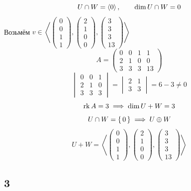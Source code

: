 $$ U \cap W = \braket{0}, \qquad \dim U \cap W = 0 $$
Возьмём $ v \in \left\langle
\begin{pmatrix}
	0 \\
    0 \\
    1 \\
    1
\end{pmatrix},
\begin{pmatrix}
	2 \\
    1 \\
    0 \\
    0
\end{pmatrix},
\begin{pmatrix}
	3 \\
    3 \\
    3 \\
    13
\end{pmatrix} \right\rangle $
$$ A =
\begin{pmatrix}
	0 & 0 & 1 & 1 \\
    2 & 1 & 0 & 0 \\
    3 & 3 & 3 & 13
\end{pmatrix} $$
$$
\begin{vmatrix}
	0 & 0 & 1 \\
    2 & 1 & 0 \\
    3 & 3 & 3
\end{vmatrix} =
\begin{vmatrix}
	2 & 1 \\
    3 & 3
\end{vmatrix} = 6 - 3 \ne 0 $$
$$ \operatorname{rk} A = 3 \implies \dim U + W = 3 $$
$$ U \cap W = \set{0} \implies U \oplus W $$
$$ U + W = \left\langle
\begin{pmatrix}
	0 \\
    0 \\
    1 \\
    1
\end{pmatrix},
\begin{pmatrix}
	2 \\
    1 \\
    0 \\
    0
\end{pmatrix},
\begin{pmatrix}
	3 \\
    3 \\
    3 \\
    13
\end{pmatrix} \right\rangle $$

\subsection{3}

